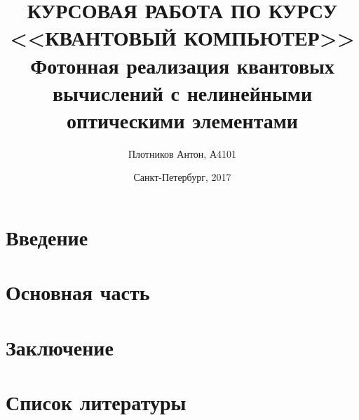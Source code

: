 \documentclass{article}
\title{КУРСОВАЯ РАБОТА ПО КУРСУ\\ <<КВАНТОВЫЙ КОМПЬЮТЕР>>\\
Фотонная реализация квантовых вычислений с нелинейными оптическими элементами}
\date{Санкт-Петербург, 2017}
\author{Плотников Антон, А4101}
\begin{document}
  \maketitle
  \newpage

  \tableofcontents
  \newpage

  \section{Введение}
  
  \newpage

  \section{Основная часть}
  
  \newpage

  \section{Заключение}
  
  \newpage
  \section{Список литературы}
  
  \newpage
\end{document}
